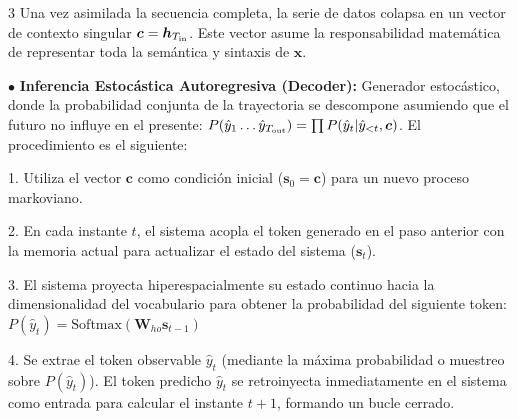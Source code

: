 \documentclass[8pt,a4paper,landscape,fleqn]{extarticle}
\begin{document}
\begin{multicols*}{3}
Una vez asimilada la secuencia completa, la serie de datos colapsa en un vector de contexto singular $\bm{c} = \bm{h}_{T_{\rm in}}$. Este vector asume la responsabilidad matemática de representar toda la semántica y sintaxis de $\bm{x}$. 

$\bullet$ \textbf{Inferencia Estocástica Autoregresiva (Decoder):} Generador estocástico, donde la probabilidad conjunta de la trayectoria se descompone asumiendo que el futuro no influye en el presente: $P(\hat{y}_1 \dots \hat{y}_{T_{\rm out}}) = \prod P(\hat{y}_t | \hat{y}_{<t}, \bm{c})$. El procedimiento es el siguiente:

1. Utiliza el vector $\bm{c}$ como condición inicial ($\bm{s}_0 = \bm{c}$) para un nuevo proceso markoviano.

2. En cada instante $t$, el sistema acopla el token generado en el paso anterior con la memoria actual para actualizar el estado del sistema ($\mathbf{s}_t$).

3. El sistema proyecta hiperespacialmente su estado continuo hacia la dimensionalidad del vocabulario para obtener la probabilidad del siguiente token: $P (\hat{y}_t) \!=\!\text{Softmax}(\bm{W}_{ho} \bm{s}_{t-1})$

4. Se extrae el token observable $\hat{y}_t$ (mediante la máxima probabilidad o muestreo sobre $P(\hat{y}_t)$). El token predicho $\hat{y}_t$ se retroinyecta inmediatamente en el sistema como entrada para calcular el instante $t+1$, formando un bucle cerrado. 
\vspace{-2mm}
\begin{center}
\end{center}
\end{multicols*}
\end{document}
